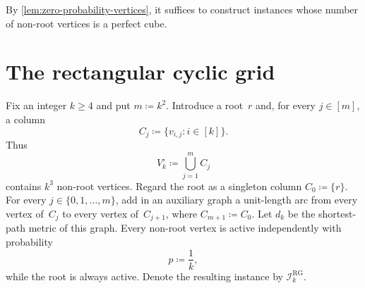 \documentclass[12pt,a4paper,oneside]{report}
\begin{document}
By \cref{lem:zero-probability-vertices}, it suffices to construct instances
whose number of non-root vertices is a perfect cube.

\section{The rectangular cyclic grid}
\label{sec:asym-adapt-grid}

\begin{construction}\label{con:rectangular-asymmetric-grid}
Fix an integer $k\ge4$ and put $m\coloneqq k^2$.  Introduce a root~$r$ and, for every
$j\in[m]$, a column
\[
    C_j\coloneqq\{v_{i,j}:i\in[k]\}.
\]
Thus
\[
    V_k^\circ\coloneqq\bigcup_{j=1}^{m}C_j
\]
contains $k^3$ non-root vertices.  Regard the root as a singleton column
$C_0\coloneqq\{r\}$.  For every $j\in\{0,1,\ldots,m\}$, add in an auxiliary
graph a unit-length arc from every vertex of~$C_j$ to every vertex
of~$C_{j+1}$, where $C_{m+1}\coloneqq C_0$.  Let $d_k$ be the shortest-path
metric of this graph.
Every non-root vertex is active independently with probability
\[
    p\coloneqq\frac1k,
\]
while the root is always active.  Denote the resulting instance by
$\mathcal I_k^{\mathrm{RG}}$.
\end{construction}
\end{document}
